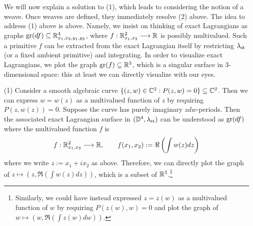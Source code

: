 \noindent We will now explain a solution to (1), which leads to considering the notion of a weave. Once weaves are defined, they immediately resolve (2) above. The idea to address (1) above is  above. Namely, we insist on thinking of exact Lagrangians as graphs $\operatorname{gr}(df)\subseteq\mathbb{R}^4_{x_1,x_2,y_1,y_2}$, where $f:\mathbb{R}^2_{x_1,x_2}\longrightarrow\mathbb{R}$ is possibly multivalued. Such a primitive $f$ can be extracted from the exact Lagrangian itself by restricting $\lambda_{\text{st}}$ (or a fixed ambient primitive) and integrating. In order to visualize exact Lagrangians, we plot the graph $\operatorname{gr}(f)\subseteq\mathbb{R}^3$, which is a singular surface in 3-dimensional space: this at least we can directly visualize with our eyes.

\begin{example}\label{ex:first_weave_plots} (1) Consider a smooth algebraic curve $\{(z,w)\in\mathbb{C}^2:P(z,w)=0\}\subseteq\mathbb{C}^2$. Then we can express $w=w(z)$ as a multivalued function of $z$ by requiring $P(z,w(z))=0$. Suppose the curve has purely imaginary $zdw$-periods. Then the associated exact Lagrangian surface in $(\mathbb{D}^4,\lambda_{\text{st}})$ can be understood as $\operatorname{gr}(df)$ where the multivalued function $f$ is
\begin{equation}\label{eq:graph_Re_integral}
f:\mathbb{R}^2_{x_1,x_2}\longrightarrow\mathbb{R},\qquad f(x_1,x_2):=\Re\left(\int w(z)dz\right)
\end{equation}
where we write $z:=x_1+ix_2$ as above. Therefore, we can directly plot the graph of $z\mapsto (z,\Re(\int w(z)dz))$, which is a subset of $\mathbb{R}^3$.\footnote{Similarly, we could have instead expressed $z=z(w)$ as a multivalued function of $w$ by requiring $P(z(w),w)=0$ and plot the graph of $w\mapsto (w,\Re(\int z(w)dw))$.}\\


\end{example}
